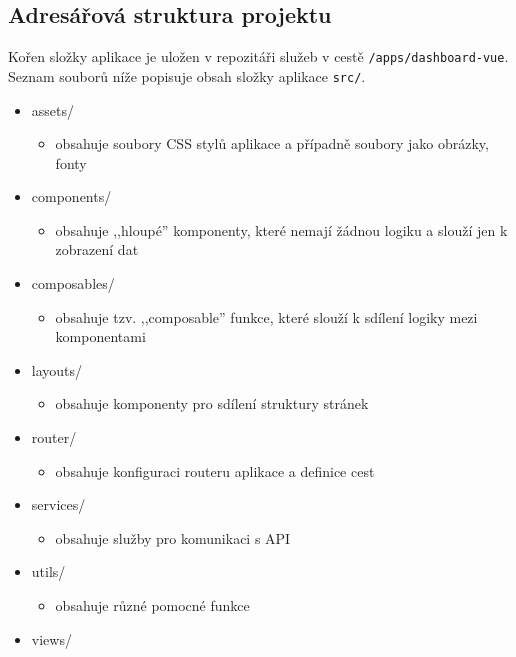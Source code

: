 \subsection{Adresářová struktura projektu}
Kořen složky aplikace je uložen v repozitáři služeb v cestě \lstinline|/apps/dashboard-vue|. Seznam souborů níže popisuje obsah složky aplikace \lstinline|src/|.

\begin{itemize}
    \item assets/
        \begin{itemize}
            \item obsahuje soubory CSS stylů aplikace a případně soubory jako obrázky, fonty
        \end{itemize}
    \item components/
        \begin{itemize}
            \item obsahuje ,,hloupé'' komponenty, které nemají žádnou logiku a slouží jen k zobrazení dat
        \end{itemize}
    \item composables/
        \begin{itemize}
            \item obsahuje tzv. ,,composable'' funkce, které slouží k sdílení logiky mezi komponentami
        \end{itemize}
    \item layouts/
        \begin{itemize}
            \item obsahuje komponenty pro sdílení struktury stránek
        \end{itemize}
    \item router/
        \begin{itemize}
            \item obsahuje konfiguraci routeru aplikace a definice cest
        \end{itemize}
    \item services/
        \begin{itemize}
            \item obsahuje služby pro komunikaci s API
        \end{itemize}
    \item utils/
        \begin{itemize}
            \item obsahuje různé pomocné funkce
        \end{itemize}
    \item views/

\end{itemize}
